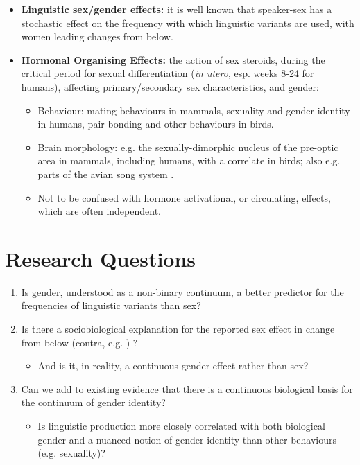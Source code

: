 \documentclass[a0,portrait]{a0poster}
\begin{document}
\begin{multicols}{2}
\begin{itemize}
		\item \textbf{Linguistic sex/gender effects:} it is well known that speaker-sex has a stochastic effect on the frequency with which linguistic variants are used, with women leading changes from below.
		\item \textbf{Hormonal Organising Effects:} the action of sex steroids, during the critical period for sexual differentiation 
		(\textsl{in utero}, esp. weeks 8-24 for humans), affecting primary/secondary sex characteristics, and gender:
			\begin{itemize}
				\item Behaviour: mating behaviours in mammals, sexuality and gender identity in humans, pair-bonding and other behaviours in birds.
				\item Brain morphology: e.g. the sexually-dimorphic nucleus of the pre-optic area in mammals, including humans, with a correlate in birds; also e.g. parts of the avian song system \citep[][]{balthazartetal2009}.
				\item Not to be confused with hormone activational, or circulating, effects, which are often independent.
			\end{itemize}
	\end{itemize}



\color{DarkSlateGray} %

\section*{Research Questions}


\begin{enumerate}
\item Is gender, understood as a non-binary continuum, a better predictor for the frequencies of linguistic variants than sex?
\item Is there a sociobiological explanation for the reported sex effect in change from below (contra, e.g. \citealt{labov2001, eckert2011}) ?
	\begin{itemize}
		\item And is it, in reality, a continuous gender effect rather than sex?
	\end{itemize}
\item Can we add to existing evidence that there is a continuous biological basis for the continuum of gender identity?
	\begin{itemize}
	\item Is linguistic production more closely correlated with both biological gender and a nuanced notion of gender identity than other behaviours (e.g. sexuality)?
	\end{itemize}



\end{enumerate}
\end{multicols}
\end{document}
